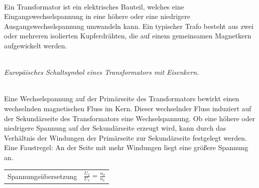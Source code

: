 \documentclass{article}
\begin{document}
\begin{mdframed}
\centering
\vspace{0.2\baselineskip}
\\
\vspace{0.5\baselineskip}
\justify
Ein Transformator ist ein elektrisches Bauteil, welches eine Eingangswechselspannung in eine höhere oder eine niedrigere Ausgangswechselspannung umwandeln kann. Ein typischer Trafo besteht aus zwei oder mehreren isolierten Kupferdrähten, die auf einem gemeinsamen Magnetkern aufgewickelt werden.
\justify
\centering
\vspace{0.5\baselineskip}
\hspace{1\baselineskip}
\begin{minipage}{0.3\linewidth}
\centering
\raisebox{-0.5\height}{}\\
\vspace{0.6\baselineskip}
\textit{Europäisches Schaltsymbol eines Transformators mit Eisenkern.}
\end{minipage}\\
\vspace{0.5\baselineskip}
\justify
Eine Wechselspannung auf der Primärseite des Transformators bewirkt einen wechselnden magnetischen Fluss im Kern. Dieser wechselnder Fluss induziert auf der Sekundärseite des Transformators eine Wechselspannung. Ob eine höhere oder niedrigere Spannung auf der Sekundärseite erzeugt wird, kann durch das Verhältnis der Windungen der Primärseite zur Sekundärseite festgelegt werden. Eine Faustregel: An der Seite mit mehr Windungen liegt eine größere Spannung an.
\justify
\centering
\begin{tabular}{cc}
     \begin{minipage}{0.25\textwidth}\vspace{0.35cm} Spannungsübersetzung \vspace{0.35cm}\end{minipage} & $\displaystyle \frac{U_2}{U_1} = \frac{n_2}{n_1}$ \\ 

\end{tabular}
\end{mdframed}
\end{document}
